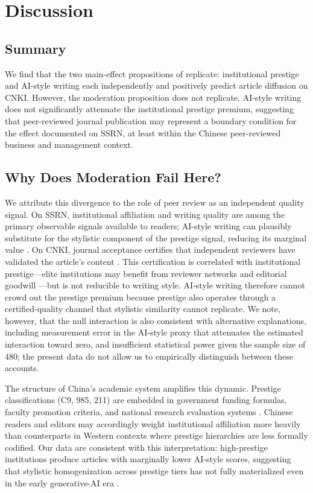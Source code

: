 \documentclass[12pt,a4paper]{article}
\begin{document}
\section{Discussion}
\label{sec:discussion}

\subsection{Summary}

We find that the two main-effect propositions of \citet{JoLi2026}
replicate: institutional prestige and AI-style writing each independently
and positively predict article diffusion on CNKI.
However, the moderation proposition does not replicate.
AI-style writing does not significantly attenuate the institutional
prestige premium, suggesting that peer-reviewed journal publication
may represent a boundary condition for the effect documented on SSRN,
at least within the Chinese peer-reviewed business and management context.

\subsection{Why Does Moderation Fail Here?}

We attribute this divergence to the role of peer review as an
independent quality signal.
On SSRN, institutional affiliation and writing quality are among the
primary observable signals available to readers; AI-style writing can
plausibly substitute for the stylistic component of the prestige signal,
reducing its marginal value \citep{JoLi2026}.
On CNKI, journal acceptance certifies that independent reviewers have
validated the article's content \citep{Bornmann2008}.
This certification is correlated with institutional prestige---elite
institutions may benefit from reviewer networks and editorial goodwill
\citep{Lariviere2010}---but is not reducible to writing style.
AI-style writing therefore cannot crowd out the prestige premium because
prestige also operates through a certified-quality channel that
stylistic similarity cannot replicate.
We note, however, that the null interaction is also consistent with
alternative explanations, including measurement error in the AI-style
proxy that attenuates the estimated interaction toward zero, and
insufficient statistical power given the sample size of 480;
the present data do not allow us to empirically distinguish between
these accounts.

The structure of China's academic system amplifies this dynamic.
Prestige classifications (C9, 985, 211) are embedded in government
funding formulas, faculty promotion criteria, and national research
evaluation systems \citep{DiMaggio1983}.
Chinese readers and editors may accordingly weight institutional
affiliation more heavily than counterparts in Western contexts where
prestige hierarchies are less formally codified.
Our data are consistent with this interpretation: high-prestige
institutions produce articles with marginally lower AI-style scores,
suggesting that stylistic homogenization across prestige tiers has not
fully materialized even in the early generative-AI era
\citep{VanNoorden2023}.
\end{document}
